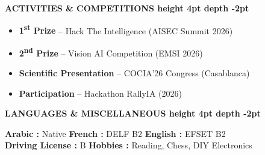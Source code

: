 \documentclass[10pt,a4paper]{altacv}
\renewcommand{\cvsection}[2][]{%
  \medskip%
  {\color{heading}\LARGE\bfseries #2 \hspace{0.2em}\leaders\vrule height 4pt depth -2pt\hfill\mbox{}}\par\smallskip
}
\begin{document}
\cvsection{ACTIVITIES \& COMPETITIONS}
\noindent\begin{minipage}[t]{0.49\linewidth}\raggedright
\begin{itemize}[leftmargin=*, label=\textbullet, itemsep=2pt]
  \item \textbf{1\textsuperscript{st} Prize} -- Hack The Intelligence (AISEC Summit 2026)
  \item \textbf{2\textsuperscript{nd} Prize} -- Vision AI Competition (EMSI 2026)
\end{itemize}
\end{minipage}\hfill
\begin{minipage}[t]{0.49\linewidth}\raggedright
\begin{itemize}[leftmargin=*, label=\textbullet, itemsep=2pt]
  \item \textbf{Scientific Presentation} -- COCIA'26 Congress (Casablanca)
  \item \textbf{Participation} -- Hackathon RallyIA (2026)
\end{itemize}
\end{minipage}

\cvsection{LANGUAGES \& MISCELLANEOUS}
\textbf{Arabic :} Native \hfill \textbf{French :} DELF B2 \hfill \textbf{English :} EFSET B2\\[2pt]
\textbf{Driving License :} B \hfill \textbf{Hobbies :} Reading, Chess, DIY Electronics
\end{document}

